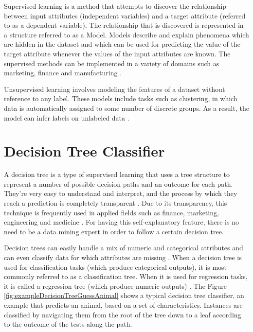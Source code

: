 Supervised learning is a method that attempts to discover the relationship between input attributes (independent variables) and a target attribute (referred to as a dependent variable).
The relationship that is discovered is represented in a structure referred
to as a Model. Models describe and explain phenomena which are
hidden in the dataset and which can be used for predicting the value of
the target attribute whenever the values of the input attributes are known.
The supervised methods can be implemented in a variety of domains such
as marketing, finance and manufacturing  \cite{rokach2008data}. 

Unsupervised learning involves modeling the features of a dataset without reference to any label. These models include tasks such as clustering, in which data is automatically assigned to some number of discrete groups. As a result, the model can infer labels on unlabeled data \cite{vanderplas2016python}.

\section{Decision Tree Classifier}

A decision tree is a type of supervised learning that uses a tree structure to represent a number of possible decision paths and
an outcome for each path. They’re very easy to understand and
interpret, and the process by which they reach a prediction is completely transparent \cite{grus2019data}. Due to its transparency, this technique is frequently
used in applied fields such as finance, marketing, engineering and medicine \cite{rokach2008data}. For having this self-explanatory feature, there is
no need to be a data mining expert in order to follow a certain decision
tree. \cite{rokach2008data}

Decision trees can easily handle a mix of
numeric and categorical attributes and
can even classify data for which attributes are missing \cite{grus2019data}.
When a decision tree is used for classification tasks  (which produce categorical
outputs), it is most commonly referred to as a classification tree. When it is used for regression tasks, it is
called a regression tree  (which produce numeric outputs) \cite{rokach2008data}. The Figure \ref{fig:exampleDecisionTreeGuessAnimal} shows a typical decision tree classifier, an example that predicts an animal, based on a set of characteristics. Instances are classified by navigating them from the root of the tree
down to a leaf according to the outcome of the tests along the path. 


